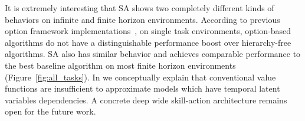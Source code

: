 \begin{table}[]
\caption{Performance of Finite Horizon Environments}
\label{table:single_finite}
\vskip 0.15in
\begin{center}
\end{center}
\vskip -0.1in
\end{table}

It is extremely interesting that SA shows two completely
different kinds of behaviors on infinite and finite horizon
environments. According to previous option framework
implementations~\cite{klissarov2017learnings,smith2018inference,harb2018waiting,zhang2019dac},
on single task environments, option-based algorithms do not have
a distinguishable performance boost over hierarchy-free
algorithms. SA also has similar behavior and achieves comparable
performance to the best baseline algorithm on most finite horizon
environments (Figure~\ref{fig:all_tasks}). In
 we conceptually explain that
conventional value functions are insufficient to approximate
models which have temporal latent variables dependencies. A
concrete deep wide skill-action architecture remains open for the
future work.

